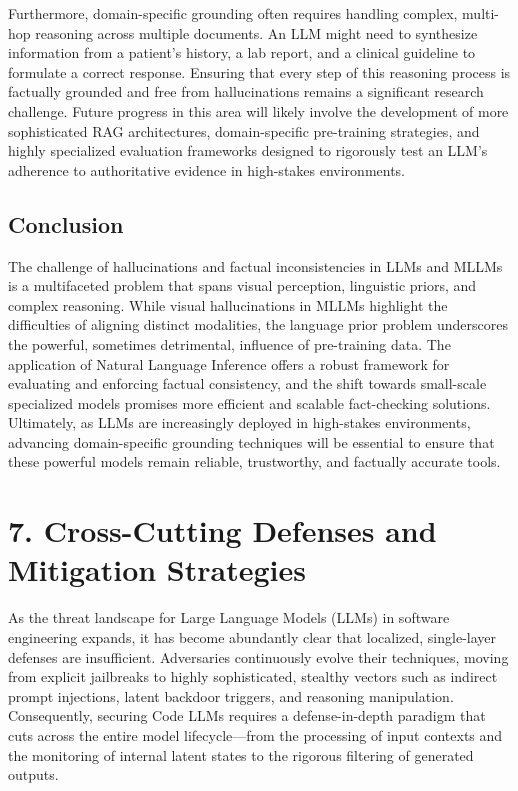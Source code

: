 \documentclass[11pt,a4paper]{article}
\begin{document}
Furthermore, domain-specific grounding often requires handling complex, multi-hop reasoning across multiple documents. An LLM might need to synthesize information from a patient's history, a lab report, and a clinical guideline to formulate a correct response. Ensuring that every step of this reasoning process is factually grounded and free from hallucinations remains a significant research challenge. Future progress in this area will likely involve the development of more sophisticated RAG architectures, domain-specific pre-training strategies, and highly specialized evaluation frameworks designed to rigorously test an LLM's adherence to authoritative evidence in high-stakes environments.

\subsection{Conclusion}

The challenge of hallucinations and factual inconsistencies in LLMs and MLLMs is a multifaceted problem that spans visual perception, linguistic priors, and complex reasoning. While visual hallucinations in MLLMs highlight the difficulties of aligning distinct modalities, the language prior problem underscores the powerful, sometimes detrimental, influence of pre-training data. The application of Natural Language Inference offers a robust framework for evaluating and enforcing factual consistency, and the shift towards small-scale specialized models promises more efficient and scalable fact-checking solutions. Ultimately, as LLMs are increasingly deployed in high-stakes environments, advancing domain-specific grounding techniques will be essential to ensure that these powerful models remain reliable, trustworthy, and factually accurate tools.

\section{7. Cross-Cutting Defenses and Mitigation Strategies}

As the threat landscape for Large Language Models (LLMs) in software engineering expands, it has become abundantly clear that localized, single-layer defenses are insufficient. Adversaries continuously evolve their techniques, moving from explicit jailbreaks to highly sophisticated, stealthy vectors such as indirect prompt injections, latent backdoor triggers, and reasoning manipulation. Consequently, securing Code LLMs requires a defense-in-depth paradigm that cuts across the entire model lifecycle---from the processing of input contexts and the monitoring of internal latent states to the rigorous filtering of generated outputs. 
\end{document}
